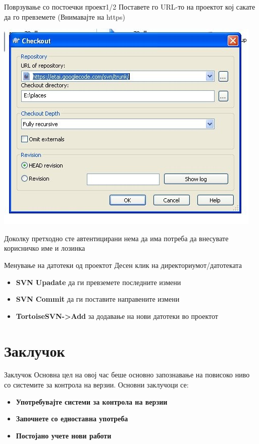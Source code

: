 \begin{frame}{Поврзување со постоечки проект}{1/2}
Поставете го URL-то на проектот кој сакате да го
превземете \alert{(Внимавајте на https)}
\begin{center}
    \includegraphics[scale=0.3]{images/svn_checkout1.png}
\end{center}
Доколку претходно сте автентицирани нема да има
потреба да внесувате корисничко име и лозинка
\end{frame}

\begin{frame}{Менување на датотеки од проектот}
Десен клик на директориумот/датотеката
\begin{itemize}
  \item \textbf{SVN Upadate} да ги превземете последните измени
  \item \textbf{SVN Commit} да ги поставите направените измени
  \item \textbf{TortoiseSVN->Add} за додавање на нови датотеки во проектот
\end{itemize}
\end{frame}

\section{Заклучок}

\begin{frame}{Заклучок}
Основна цел на овој час беше основно запознавање на повисоко ниво со системите
за контрола на верзии.
Основни заклучоци се:
\begin{itemize}
  \item \textbf{Употребувајте системи за контрола на верзии}
  \item \textbf{Започнете со едноставна употреба}
  \item \textbf{Постојано учете нови работи}
\end{itemize}
\end{frame}


